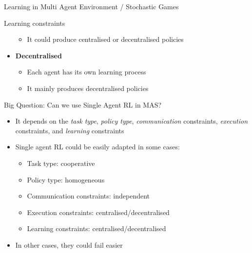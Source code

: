 \documentclass[presentation, 9pt]{beamer}\mode<presentation>{\usetheme{AMSBolognaFC}}
\begin{document}
\begin{frame}[allowframebreaks]{Learning in Multi Agent Environment / Stochastic Games}
\begin{exampleblock}{Learning constraints}
\begin{itemize}
\begin{itemize}
		\item It could produce centralised or decentralised policies
	\end{itemize}
	\item \textbf{Decentralised}
	\begin{itemize}
		\item Each agent has its own learning process
		\item It mainly produces decentralised policies
	\end{itemize}
\end{itemize}
\end{exampleblock}

\begin{alertblock}{Big Question: Can we use Single Agent RL in MAS?}
\begin{itemize}
	\item It depends on the \emph{task type}, \emph{policy type}, \emph{communication} constraints, \emph{execution} constraints, and \emph{learning} constraints
	\item Single agent RL could be easily adapted in some cases:
	\begin{itemize}
		\item Task type: cooperative
		\item Policy type: homogeneous
		\item Communication constraints: independent
		\item Execution constraints: centralised/decentralised
		\item Learning constraints: centralised/decentralised
	\end{itemize}
	\item In other cases, they could fail easier
\end{itemize}
\end{alertblock}
\end{frame}
\end{document}
